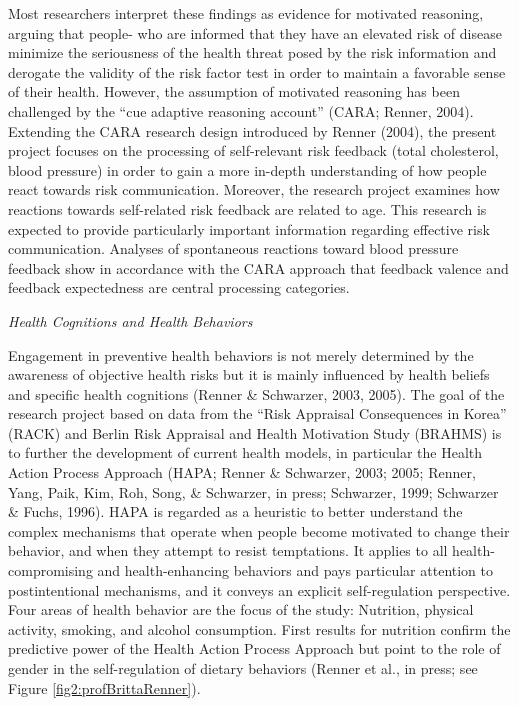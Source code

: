 \enlargethispage*{0.5cm}

 Most researchers interpret these findings as evidence for motivated reasoning, arguing that people- who are informed that they have an elevated risk of disease minimize the seriousness of the health threat posed by the risk information and derogate the validity of the risk factor test in order to maintain a favorable sense of their health. However, the assumption of motivated reasoning has been challenged by the ``cue adaptive reasoning account'' (CARA; Renner, 2004). Extending the CARA research design introduced by Renner (2004), the present project focuses on the processing of self-relevant risk feedback (total cholesterol, blood pressure) in order to gain a more in-depth understanding of how people react towards risk communication. Moreover, the research project examines how reactions towards self-related risk feedback are related to age. This research is expected to provide particularly important information regarding effective risk communication. Analyses of spontaneous reactions toward blood pressure feedback show in accordance with the CARA approach that feedback valence and feedback expectedness are central processing categories.

\newpage
\textit{Health Cognitions and Health Behaviors}

 Engagement in preventive health behaviors is not merely determined by the awareness of objective health risks but it is mainly influenced by health beliefs and specific health cognitions (Renner \& Schwarzer, 2003, 2005). The goal of the research project based on data from the ``Risk Appraisal Consequences in Korea'' (RACK) and Berlin Risk Appraisal and Health Motivation Study (BRAHMS) is to further the development of current health models, in particular the Health Action Process Approach (HAPA; Renner \& Schwarzer, 2003; 2005; Renner, Yang, Paik, Kim, Roh, Song, \& Schwarzer, in press; Schwarzer, 1999; Schwarzer \& Fuchs, 1996). HAPA is regarded as a heuristic to better understand the complex mechanisms that operate when people become motivated to change their behavior, and when they attempt to resist temptations. It applies to all health-compromising and health-enhancing behaviors and pays particular attention to postintentional mechanisms, and it conveys an explicit self-regulation perspective. Four areas of health behavior are the focus of the study: Nutrition, physical activity, smoking, and alcohol consumption. First results for nutrition confirm the predictive power of the Health Action Process Approach but point to the role of gender in the self-regulation of dietary behaviors (Renner et al., in press; see Figure \ref{fig2:profBrittaRenner}).

